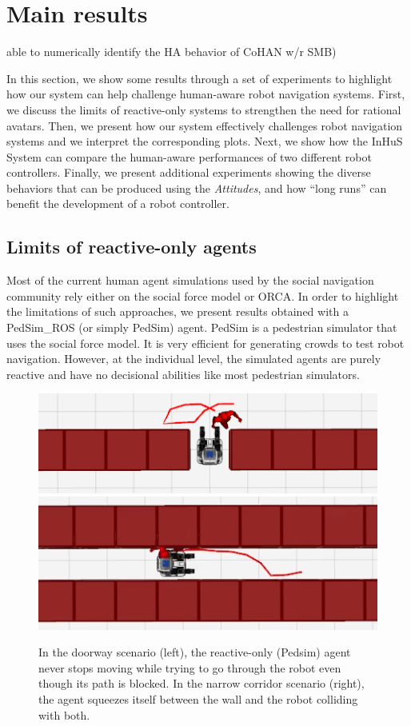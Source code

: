 \section{Main results}
able to numerically identify the HA behavior of CoHAN w/r SMB)


In this section, we show some results through a set of experiments to highlight how our system can help challenge human-aware robot navigation systems. First, we discuss the limits of reactive-only systems to strengthen the need for rational avatars. 
Then, we present how our system effectively challenges robot navigation systems and we interpret the corresponding plots.
Next, we show how the InHuS System can compare the human-aware performances of two different robot controllers.
Finally, we present additional experiments showing the diverse behaviors that can be produced using the \textit{Attitudes}, and how ``long runs'' can benefit the development of a robot controller.

\subsection{Limits of reactive-only agents}
\label{sec:pedsim_compare}
Most of the current human agent simulations used by the social navigation community rely either on the social force model or ORCA. In order to highlight the limitations of such approaches, we present results obtained with a PedSim\_ROS (or simply PedSim) agent. PedSim is a pedestrian simulator that uses the social force model. It is very efficient for generating crowds to test robot navigation. However, at the individual level, the simulated agents are purely reactive and have no decisional abilities like most pedestrian simulators. 

\begin{figure}
    \centering
    \includegraphics[width=0.4\linewidth]{images/Chapter6/pedsim_blocked.png}
    \includegraphics[width=0.4\linewidth]{images/Chapter6/pedsim_narrow_2.png}
    \caption{
    In the doorway scenario (left), the reactive-only (Pedsim) agent never stops moving while trying to go through the robot even though its path is blocked. 
    In the narrow corridor scenario (right), the agent squeezes itself between the wall and the robot colliding with both. 
    }
    \label{fig:limits_reactive}
    \vspace{-0.3cm}
\end{figure}

